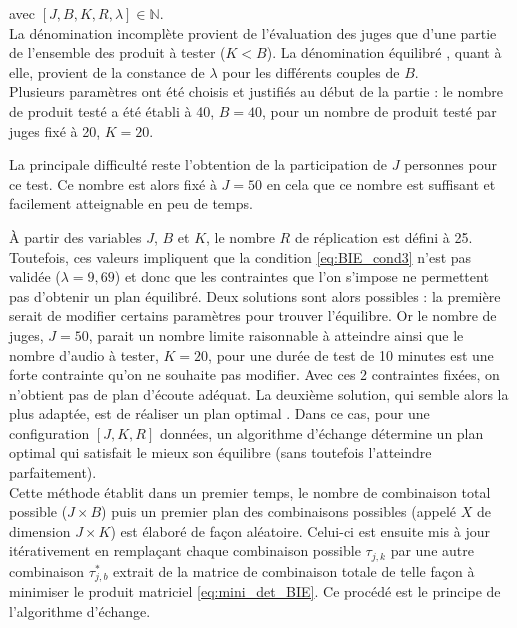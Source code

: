 avec $\left[J, B, K, R, \lambda\right] \in \mathbb{N}$.\\

La dénomination \og incomplète \fg{} provient de l'évaluation des juges que d'une partie de l'ensemble des produit à tester ($K < B$). La dénomination \og équilibré \fg{}, quant à elle, provient de la constance de $\lambda$ pour les différents couples de $B$. \\

Plusieurs paramètres ont été choisis et justifiés au début de la partie : le nombre de produit testé a été établi à 40, $B = 40$, pour un nombre de produit testé par juges fixé à 20, $K = 20$. 

La principale difficulté reste l'obtention de la participation de $J$ personnes pour ce test. Ce nombre est alors fixé à $J = 50$ en cela que ce nombre est suffisant et facilement atteignable en peu de temps.

À partir des variables $J$, $B$ et $K$, le nombre $R$ de réplication est défini à 25. Toutefois, ces valeurs impliquent que la condition \ref{eq:BIE_cond3} n'est pas validée ($\lambda = 9,69$) et donc que les contraintes que l'on s'impose ne permettent pas d'obtenir un plan équilibré. Deux solutions sont alors possibles : la première serait de modifier certains paramètres pour trouver l'équilibre. Or le nombre de juges, $J = 50$, parait un nombre limite raisonnable à atteindre ainsi que le nombre d'audio à tester, $K = 20$, pour une durée de test de 10 minutes est une forte contrainte qu'on ne souhaite pas modifier. Avec ces 2 contraintes fixées, on n'obtient pas de plan d'écoute adéquat. La deuxième solution, qui semble alors la plus adaptée, est de réaliser un plan optimal \cite{pages_blocs_2007}. Dans ce cas, pour une configuration $\left[J, K, R\right]$ données, un algorithme d'échange détermine un \og plan optimal \fg{} qui satisfait le mieux son équilibre (sans toutefois l'atteindre parfaitement).\\

Cette méthode établit dans un premier temps, le nombre de combinaison total possible ($J \times B$) puis un premier plan des combinaisons possibles (appelé $X$ de dimension $J \times K$) est élaboré de façon aléatoire. Celui-ci est ensuite mis à jour itérativement en remplaçant chaque combinaison possible $\tau_{j,k}$ par une autre combinaison $\tau^{*}_{j,b}$ extrait de la matrice de combinaison totale de telle façon à minimiser le produit matriciel \ref{eq:mini_det_BIE}. Ce procédé est le principe de l'algorithme d'échange.

